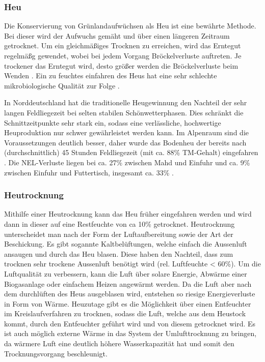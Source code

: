 \subsubsection{Heu}
\label{subsub:Heu}
Die Konservierung von Grünlandaufwüchsen als Heu ist eine bewährte Methode.
Bei dieser wird der Aufwuchs gemäht und über einen längeren Zeitraum getrocknet.
Um ein gleichmäßiges Trocknen zu erreichen, wird das Erntegut regelmäßg gewendet, wobei bei jedem Vorgang Bröckelverluste auftreten.
Je trockener das Erntegut wird, desto größer werden die Bröckelverluste beim Wenden \parencite[12]{sauter2008brockelverluste}.
Ein zu feuchtes einfahren des Heus hat eine sehr schlechte mikrobiologische Qualität zur Folge \parencite[269]{besier2013heu}.

In Norddeutschland hat die traditionelle Heugewinnung den Nachteil der sehr langen Feldliegezeit bei selten stabilen Schönwetterphasen.
Dies schränkt die Schnittzeitpunkte sehr stark ein, sodass eine verlässliche, hochwertige Heuproduktion nur schwer gewährleistet werden kann.
Im Alpenraum sind die Voraussetzungen deutlich besser, daher wurde das Bodenheu der \HBLFA bereits nach (durchschnittlich) 45 Stunden Feldliegezeit (mit ca. 88\% \ac{TM}-Gehalt) eingefahren \parencite[63]{gruber2015einfluss}.
Die \ac{NEL}-Verluste liegen bei ca. 27\% zwischen Mahd und Einfuhr und ca. 9\% zwischen Einfuhr und Futtertisch, insgesamt ca. 33\% \parencite[30]{fritz2018wirtschaftliche}.

\subsubsection{Heutrocknung}
\label{subsub:Heutrocknung}
Mithilfe einer Heutrocknung kann das Heu früher eingefahren werden und wird dann in dieser auf eine Restfeuchte von ca 10\% getrocknet.
Heutrocknung unterscheidet man nach der Form der Luftaufbereitung sowie der Art der Beschickung.
Es gibt sogannte Kaltbelüftungen, welche einfach die Aussenluft ansaugen und durch das Heu blasen.
Diese haben den Nachteil, dass zum trocknen sehr trockene Aussenluft benötigt wird (rel. Luftfeuchte < 60\%).
Um die Luftqualität zu verbessern, kann die Luft über solare Energie, Abwärme einer Biogasanlage oder einfachem Heizen angewärmt werden.
Da die Luft aber nach dem durchlüften des Heus ausgeblasen wird, entstehen so riesige Energieverluste in Form von Wärme.
Heuzutage gibt es die Möglichkeit über einen Entfeuchter im Kreislaufverfahren zu trocknen, sodass die Luft, welche aus dem Heustock kommt, durch den Entfeuchter geführt wird und von diesem getrocknet wird.
Es ist auch möglich externe Wärme in das System der Umlufttrocknung zu bringen, da wärmere Luft eine deutlich höhere Wasserkapazität hat und somit den Trocknungsvorgang beschleunigt.

